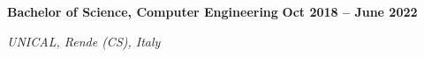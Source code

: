 \documentclass[9pt, a4paper]{article}
\newcommand{\cvsubsection}[3]{%
  \par %
  {\large\bfseries #1} %
  \hfill %
  {\bfseries #2} %
  \par %
  {\textit{#3}} %
  \vspace{4pt} %
}
\begin{document}
\begin{minipage}[t]{0.70\textwidth}
\vspace{6pt} %
\cvsubsection
  {Bachelor of Science, Computer Engineering} %
  {Oct 2018 -- June 2022} %
  {UNICAL, Rende (CS), Italy} %
  

\end{minipage}
\hfill %
\end{document}
